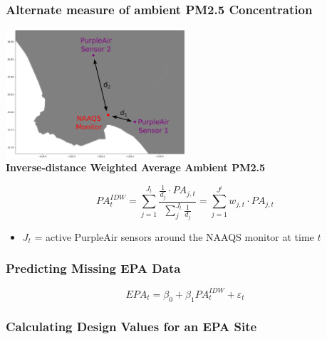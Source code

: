 \documentclass{beamer}
\begin{document}
\begin{frame}
\frametitle{Alternate measure of ambient PM2.5 Concentration}

\hspace{7em}
\includegraphics[width=0.5\textwidth]{output/figures/diagrams/IDW_diagram.png}
\\
\textbf{Inverse-distance Weighted Average Ambient PM2.5}

\begin{equation*}
    PA^{IDW}_t= \sum\limits_{j=1}^{J_t} \dfrac{\frac{1}{d_j}\cdot PA_{j,t}}{\sum\limits_j^{J_t}\frac{1}{d_j}}
    = \sum\limits_{j=1}^{J^t} w_{j,t}\cdot PA_{j,t}
\end{equation*}
\begin{itemize}
    \item $J_t$ = active PurpleAir sensors around the NAAQS monitor at time $t$
\end{itemize}

\end{frame}


\begin{frame}
\frametitle{Predicting Missing EPA Data}
\begin{equation*}
EPA_t = \beta_0 + \beta_1 PA^{IDW}_t + \varepsilon_t
\end{equation*}


\end{frame}


\begin{frame}
\frametitle{Calculating Design Values for an EPA Site}
\end{frame}
\end{document}
